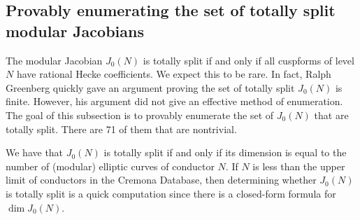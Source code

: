 \documentclass{article}
\begin{document}
\subsection{Provably enumerating the set of totally split modular Jacobians}

The modular Jacobian $J_0(N)$ is totally split if and only if all cuspforms of
level $N$ have rational Hecke coefficients. We expect this to be rare. In fact,
Ralph Greenberg quickly gave an argument proving the set of totally split
$J_0(N)$ is finite. However, his argument did not give an effective method of
enumeration. The goal of this subsection is to provably enumerate the set of
$J_0(N)$ that are totally split. There are 71 of them that are nontrivial.

We have that $J_0(N)$ is totally split if and only if its dimension is equal to
the number of (modular) elliptic curves of conductor $N$. If $N$ is less than
the upper limit of conductors in the Cremona Database, then determining whether
$J_0(N)$ is totally split is a quick computation since there is a closed-form
formula for $\dim J_0(N)$.  
\end{document}
